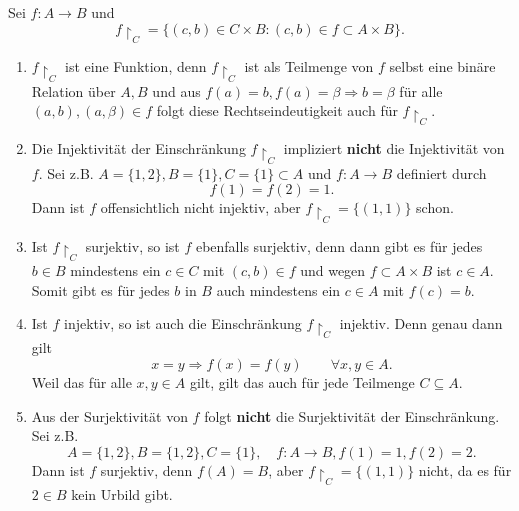 \documentclass[a4paper]{article}
\newcommand{\wup}{\upharpoonright}
\begin{document}
\subsection{}
Sei $f\colon A\to B$ und 
$$f\wup_C = \{ (c,b) \in C\times B: (c,b)\in f\subset A\times B \}.$$

\begin{enumerate}[label=\alph*)]
\item $f\wup_C$ ist eine Funktion, denn $f\wup_C$ ist als Teilmenge von $f$ selbst eine binäre Relation über $A,B$ und aus $f(a) = b, f(a) = β \Rightarrow b=β$ für alle $(a,b), (a,β)\in f$ folgt diese Rechtseindeutigkeit auch für $f\wup_C$. 
\item Die Injektivität der Einschränkung $f\wup_C$ impliziert \textbf{nicht} die Injektivität von $f$. Sei z.B. $A = \{1,2\}, B = \{ 1\}, C = \{ 1 \} \subset A$ und $f\colon A \to B$ definiert durch
$$f(1) = f(2) = 1.$$
Dann ist $f$ offensichtlich nicht injektiv, aber $f\wup_C = \{ (1, 1) \}$ schon.
\item Ist $f\wup_C$ surjektiv, so ist $f$ ebenfalls surjektiv, denn dann gibt es für jedes $b\in B$ mindestens ein $c\in C$ mit $(c,b)\in f$ und wegen $f\subset A\times B$ ist $c\in A$. Somit gibt es für jedes $b$ in $B$ auch mindestens ein $c\in A$ mit $f(c) = b$. 
\item Ist $f$ injektiv, so ist auch die Einschränkung $f\wup_C$ injektiv. Denn genau dann gilt 
$$ x = y \Rightarrow f(x) = f(y) \qquad ∀ x,y \in A.$$
Weil das für alle $x,y\in A$ gilt, gilt das auch für jede Teilmenge $C\subseteq A$.
\item Aus der Surjektivität von $f$ folgt \textbf{nicht} die Surjektivität der Einschränkung. Sei z.B.
$$A = \{ 1,2\}, B = \{ 1,2\}, C = \{ 1\}, \quad f\colon A\to B, f(1) = 1, f(2) = 2.$$
Dann ist $f$ surjektiv, denn $f(A) = B$, aber $f\wup_C = \{ (1,1) \}$ nicht, da es für $2 \in B$ kein Urbild gibt.
\end{enumerate}

\end{document}
